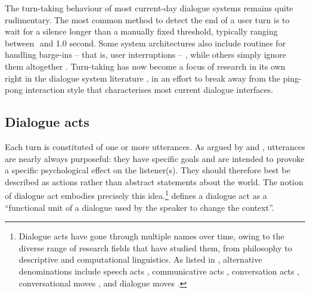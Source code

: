 The turn-taking behaviour of most current-day dialogue systems remains quite rudimentary.  The most common method to detect the end of a user turn is to wait for a silence longer than a manually fixed threshold, typically ranging between 
\textonehalf  $ $ and 1.0 second.  Some system architectures also include routines for handling barge-ins -- that is, user interruptions --  \citep{StromS00}, while others simply ignore them altogether . Turn-taking has now become a focus of research in its own right in the dialogue system literature \citep{RauxE09,Gravano2011}, in an effort to break away from the ping-pong interaction style that characterises most current dialogue interfaces.  

\subsection{Dialogue acts}

Each turn is constituted of one or more utterances.  As argued by \cite{Austin1962} and \cite{Searle1969}, utterances are nearly always purposeful: they have specific goals and are intended to provoke a specific psychological effect on the listener(s).  They should therefore best be described as actions rather than abstract statements about the world.  The notion of dialogue act embodies precisely this idea.\footnote{Dialogue acts have gone through multiple names over time, owing to the diverse range of research fields that have studied them, from philosophy to descriptive and computational linguistics.  As listed in \cite{mctear2004}, alternative denominations include speech acts \citep{Searle1969}, communicative acts \citep{allwood1976}, conversation acts \citep{TraumH92}, conversational moves \citep{sinclair1975}, and dialogue moves \citep{LarssonCEL99}.} \cite{Bunt1996} defines a dialogue act as a ``functional unit of a dialogue used by the speaker to change the context''.

